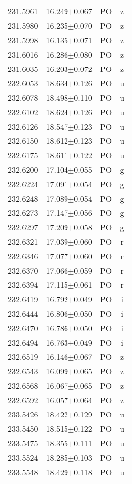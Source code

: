 \begin{table}
\begin{tabular}{cccc}
231.5961 & 16.249$\pm$0.067 & PO & z \\
231.5980 & 16.235$\pm$0.070 & PO & z \\
231.5998 & 16.135$\pm$0.071 & PO & z \\
231.6016 & 16.286$\pm$0.080 & PO & z \\
231.6035 & 16.203$\pm$0.072 & PO & z \\
232.6053 & 18.634$\pm$0.126 & PO & u \\
232.6078 & 18.498$\pm$0.110 & PO & u \\
232.6102 & 18.624$\pm$0.126 & PO & u \\
232.6126 & 18.547$\pm$0.123 & PO & u \\
232.6150 & 18.612$\pm$0.123 & PO & u \\
232.6175 & 18.611$\pm$0.122 & PO & u \\
232.6200 & 17.104$\pm$0.055 & PO & g \\
232.6224 & 17.091$\pm$0.054 & PO & g \\
232.6248 & 17.089$\pm$0.054 & PO & g \\
232.6273 & 17.147$\pm$0.056 & PO & g \\
232.6297 & 17.209$\pm$0.058 & PO & g \\
232.6321 & 17.039$\pm$0.060 & PO & r \\
232.6346 & 17.077$\pm$0.060 & PO & r \\
232.6370 & 17.066$\pm$0.059 & PO & r \\
232.6394 & 17.115$\pm$0.061 & PO & r \\
232.6419 & 16.792$\pm$0.049 & PO & i \\
232.6444 & 16.806$\pm$0.050 & PO & i \\
232.6470 & 16.786$\pm$0.050 & PO & i \\
232.6494 & 16.763$\pm$0.049 & PO & i \\
232.6519 & 16.146$\pm$0.067 & PO & z \\
232.6543 & 16.099$\pm$0.065 & PO & z \\
232.6568 & 16.067$\pm$0.065 & PO & z \\
232.6592 & 16.057$\pm$0.064 & PO & z \\
233.5426 & 18.422$\pm$0.129 & PO & u \\
233.5450 & 18.515$\pm$0.122 & PO & u \\
233.5475 & 18.355$\pm$0.111 & PO & u \\
233.5524 & 18.285$\pm$0.103 & PO & u \\
233.5548 & 18.429$\pm$0.118 & PO & u \\

\end{tabular}
\end{table}
